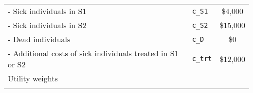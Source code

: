 \documentclass[
]{article}
\begin{document}
\begin{longtable}[]{@{}llc@{}}
\begin{minipage}[t]{0.51\columnwidth}\raggedright
- Sick individuals in S1\strut
\end{minipage} & \begin{minipage}[t]{0.19\columnwidth}\raggedright
\texttt{c\_S1}\strut
\end{minipage} & \begin{minipage}[t]{0.21\columnwidth}\centering
\$4,000\strut
\end{minipage}\tabularnewline
\begin{minipage}[t]{0.51\columnwidth}\raggedright
- Sick individuals in S2\strut
\end{minipage} & \begin{minipage}[t]{0.19\columnwidth}\raggedright
\texttt{c\_S2}\strut
\end{minipage} & \begin{minipage}[t]{0.21\columnwidth}\centering
\$15,000\strut
\end{minipage}\tabularnewline
\begin{minipage}[t]{0.51\columnwidth}\raggedright
- Dead individuals\strut
\end{minipage} & \begin{minipage}[t]{0.19\columnwidth}\raggedright
\texttt{c\_D}\strut
\end{minipage} & \begin{minipage}[t]{0.21\columnwidth}\centering
\$0\strut
\end{minipage}\tabularnewline
\begin{minipage}[t]{0.51\columnwidth}\raggedright
- Additional costs of sick individuals treated in S1 or S2\strut
\end{minipage} & \begin{minipage}[t]{0.19\columnwidth}\raggedright
\texttt{c\_trt}\strut
\end{minipage} & \begin{minipage}[t]{0.21\columnwidth}\centering
\$12,000\strut
\end{minipage}\tabularnewline
\begin{minipage}[t]{0.51\columnwidth}\raggedright
Utility weights\strut
\end{minipage} & \begin{minipage}[t]{0.19\columnwidth}\raggedright
\strut
\end{minipage} & \begin{minipage}[t]{0.21\columnwidth}\centering
\strut
\end{minipage}\tabularnewline
\begin{minipage}[t]{0.51\columnwidth}\raggedright

\end{minipage}
\end{longtable}
\end{document}
